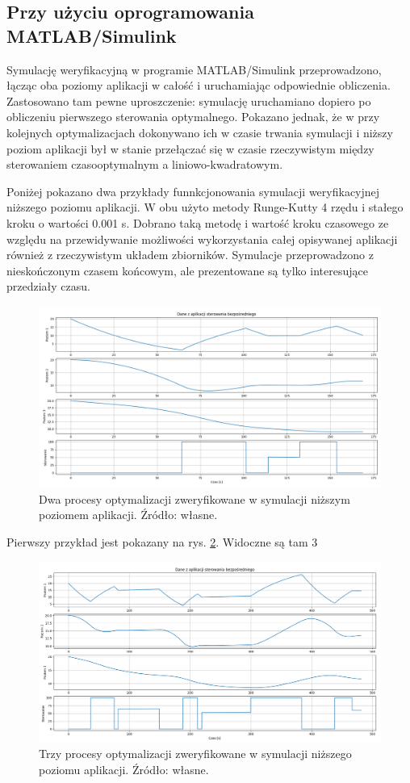 \subsection{Przy użyciu oprogramowania MATLAB/Simulink}
\label{sub:sym-wer-matlab}


Symulację weryfikacyjną w programie MATLAB/Simulink przeprowadzono, łącząc oba poziomy aplikacji w całość i uruchamiając odpowiednie obliczenia. Zastosowano tam pewne uproszczenie: symulację uruchamiano dopiero po obliczeniu pierwszego sterowania optymalnego. Pokazano jednak, że w przy kolejnych optymalizacjach dokonywano ich w czasie trwania symulacji i niższy poziom aplikacji był w stanie przełączać się w czasie rzeczywistym między sterowaniem czasooptymalnym a liniowo-kwadratowym.

Poniżej pokazano dwa przykłady funnkcjonowania symulacji weryfikacyjnej niższego poziomu aplikacji.
W obu użyto metody Runge-Kutty 4 rzędu i stałego kroku o wartości 0.001 s. Dobrano taką metodę i wartość kroku czasowego ze względu na przewidywanie możliwości wykorzystania całej opisywanej aplikacji również z rzeczywistym układem zbiorników.
Symulacje przeprowadzono z nieskończonym czasem końcowym, ale prezentowane są tylko interesujące przedziały czasu.

\begin{figure}
    \centering
    \includegraphics[scale=0.5,angle=90]{Grafika/ext_ctrl_2_opts}
    \caption{Dwa procesy optymalizacji zweryfikowane w symulacji niższym poziomem aplikacji. Źródło: własne.}
    \label{fig:extctrl2opts}
\end{figure}

Pierwszy przykład jest pokazany na rys. \ref{fig:extctrl3opts}. Widoczne są tam 3 

\begin{figure}
    \centering
    \includegraphics[scale=0.5,angle=90]{Grafika/ext_ctrl_3_opts}
    \caption{Trzy procesy optymalizacji zweryfikowane w symulacji niższego poziomu aplikacji. Źródło: własne.}
    \label{fig:extctrl3opts}
\end{figure}
